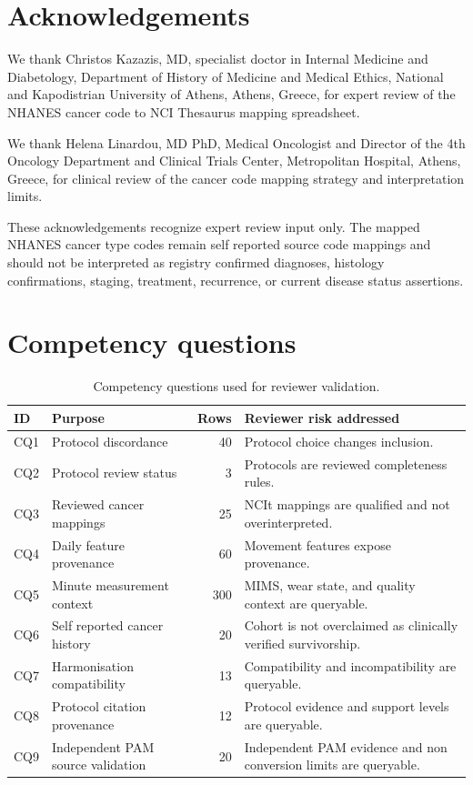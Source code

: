 \documentclass[final,5p,times,twocolumn]{elsarticle}
\begin{document}
\section*{Acknowledgements}

We thank Christos Kazazis, MD, specialist doctor in Internal Medicine and Diabetology, Department of History of Medicine and Medical Ethics, National and Kapodistrian University of Athens, Athens, Greece, for expert review of the NHANES cancer code to NCI Thesaurus mapping spreadsheet.

We thank Helena Linardou, MD PhD, Medical Oncologist and Director of the 4th Oncology Department and Clinical Trials Center, Metropolitan Hospital, Athens, Greece, for clinical review of the cancer code mapping strategy and interpretation limits.

These acknowledgements recognize expert review input only. The mapped NHANES cancer type codes remain self reported source code mappings and should not be interpreted as registry confirmed diagnoses, histology confirmations, staging, treatment, recurrence, or current disease status assertions.

\appendix

\section{Competency questions}
\label{app:cq}

\begin{table}[t]
\caption{Competency questions used for reviewer validation.}
\label{tab:cq}
\centering
\small
\begin{tabularx}{\textwidth}{>{\raggedright\arraybackslash}p{}>{\raggedright\arraybackslash}p{}rY}
\toprule
ID & Purpose & Rows & Reviewer risk addressed \\
\midrule
CQ1 & Protocol discordance & 40 & Protocol choice changes inclusion. \\
CQ2 & Protocol review status & 3 & Protocols are reviewed completeness rules. \\
CQ3 & Reviewed cancer mappings & 25 & NCIt mappings are qualified and not overinterpreted. \\
CQ4 & Daily feature provenance & 60 & Movement features expose provenance. \\
CQ5 & Minute measurement context & 300 & MIMS, wear state, and quality context are queryable. \\
CQ6 & Self reported cancer history & 20 & Cohort is not overclaimed as clinically verified survivorship. \\
CQ7 & Harmonisation compatibility & 13 & Compatibility and incompatibility are queryable. \\
CQ8 & Protocol citation provenance & 12 & Protocol evidence and support levels are queryable. \\
CQ9 & Independent PAM source validation & 20 & Independent PAM evidence and non conversion limits are queryable. \\
\bottomrule
\end{tabularx}
\end{table}
\end{document}
